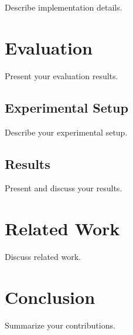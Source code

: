 \documentclass[sigplan,10pt]{acmart}
\begin{document}
Describe implementation details.

\section{Evaluation}
\label{sec:evaluation}

Present your evaluation results.

\subsection{Experimental Setup}

Describe your experimental setup.

\subsection{Results}

Present and discuss your results.

\section{Related Work}
\label{sec:related}

Discuss related work.

\section{Conclusion}
\label{sec:conclusion}

Summarize your contributions.



\end{document}
